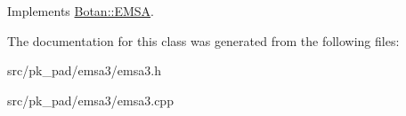 Implements \hyperlink{classBotan_1_1EMSA_ac8462800c17e8e81bcd99dbf79337d3a}{Botan\-::\-E\-M\-S\-A}.



The documentation for this class was generated from the following files\-:\begin{DoxyCompactItemize}
\item 
src/pk\-\_\-pad/emsa3/emsa3.\-h\item 
src/pk\-\_\-pad/emsa3/emsa3.\-cpp\end{DoxyCompactItemize}
